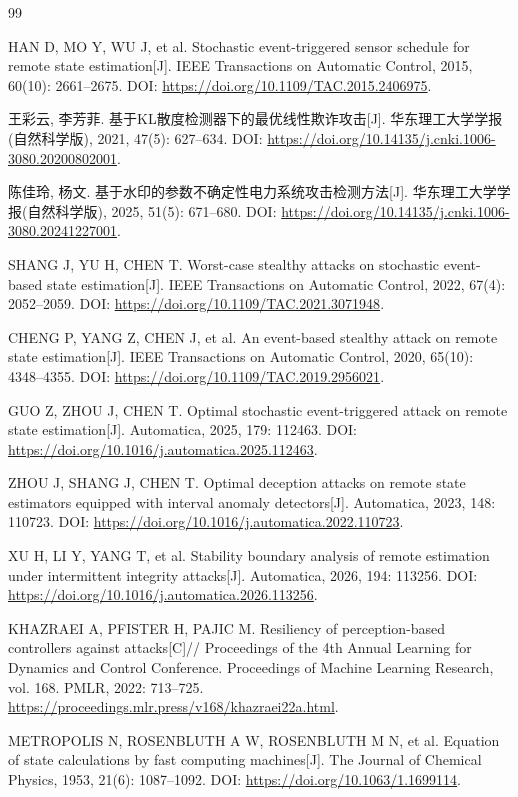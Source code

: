 \begin{thebibliography}{99}

HAN D, MO Y, WU J, et al.
Stochastic event-triggered sensor schedule for remote state estimation[J].
IEEE Transactions on Automatic Control, 2015, 60(10): 2661--2675.
DOI: \url{https://doi.org/10.1109/TAC.2015.2406975}.

王彩云, 李芳菲.
基于KL散度检测器下的最优线性欺诈攻击[J].
华东理工大学学报(自然科学版), 2021, 47(5): 627--634.
DOI: \url{https://doi.org/10.14135/j.cnki.1006-3080.20200802001}.

陈佳玲, 杨文.
基于水印的参数不确定性电力系统攻击检测方法[J].
华东理工大学学报(自然科学版), 2025, 51(5): 671--680.
DOI: \url{https://doi.org/10.14135/j.cnki.1006-3080.20241227001}.

SHANG J, YU H, CHEN T.
Worst-case stealthy attacks on stochastic event-based state estimation[J].
IEEE Transactions on Automatic Control, 2022, 67(4): 2052--2059.
DOI: \url{https://doi.org/10.1109/TAC.2021.3071948}.

CHENG P, YANG Z, CHEN J, et al.
An event-based stealthy attack on remote state estimation[J].
IEEE Transactions on Automatic Control, 2020, 65(10): 4348--4355.
DOI: \url{https://doi.org/10.1109/TAC.2019.2956021}.

GUO Z, ZHOU J, CHEN T.
Optimal stochastic event-triggered attack on remote state estimation[J].
Automatica, 2025, 179: 112463.
DOI: \url{https://doi.org/10.1016/j.automatica.2025.112463}.

ZHOU J, SHANG J, CHEN T.
Optimal deception attacks on remote state estimators equipped with interval anomaly detectors[J].
Automatica, 2023, 148: 110723.
DOI: \url{https://doi.org/10.1016/j.automatica.2022.110723}.

XU H, LI Y, YANG T, et al.
Stability boundary analysis of remote estimation under intermittent integrity attacks[J].
Automatica, 2026, 194: 113256.
DOI: \url{https://doi.org/10.1016/j.automatica.2026.113256}.

KHAZRAEI A, PFISTER H, PAJIC M.
Resiliency of perception-based controllers against attacks[C]//
Proceedings of the 4th Annual Learning for Dynamics and Control Conference.
Proceedings of Machine Learning Research, vol. 168.
PMLR, 2022: 713--725.
\url{https://proceedings.mlr.press/v168/khazraei22a.html}.

METROPOLIS N, ROSENBLUTH A W, ROSENBLUTH M N, et al.
Equation of state calculations by fast computing machines[J].
The Journal of Chemical Physics, 1953, 21(6): 1087--1092.
DOI: \url{https://doi.org/10.1063/1.1699114}.


\end{thebibliography}
